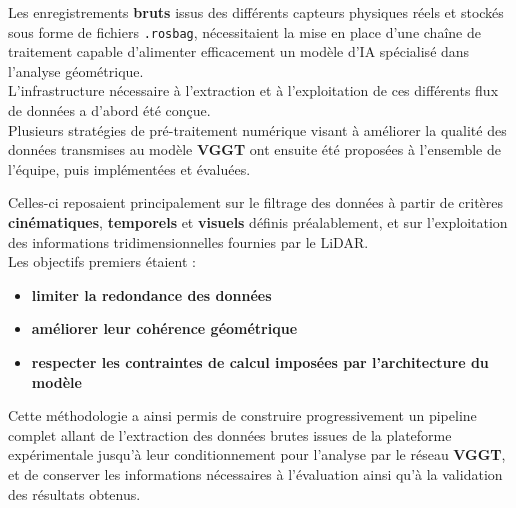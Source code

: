 \documentclass[12pt,a4paper,oneside]{report}
\newcommand{\textsb}[1]{{\fontseries{sb}\selectfont #1}}
\begin{document}
\hspace*{.5cm}Les enregistrements \textbf{bruts} issus des différents capteurs physiques réels et stockés sous forme de fichiers \texttt{.rosbag}, nécessitaient la mise en place d'une chaîne de traitement capable d'alimenter efficacement un modèle d'IA spécialisé dans l'analyse géométrique.\\

\hspace*{.3cm}L'infrastructure nécessaire à l'extraction et à l'exploitation de ces différents flux de données a d'abord été conçue.\\
\hspace*{0.3cm}Plusieurs stratégies de pré-traitement numérique visant à améliorer la qualité des données transmises au modèle \textbf{VGGT} ont ensuite été proposées à l'ensemble de l'équipe, puis implémentées et évaluées.\\

\bigskip

\hspace*{.3cm}Celles-ci reposaient principalement sur le filtrage des données à partir de critères \textbf{cinématiques}, \textbf{temporels} et \textbf{visuels} définis préalablement, et sur l'exploitation des informations tridimensionnelles fournies par le LiDAR.\\
Les objectifs premiers étaient :\vspace{0.2cm}

\begin{itemize}[label=\textbullet, leftmargin=2cm]
    \item \textbf{limiter la redondance des données}
    \item \textbf{améliorer leur cohérence géométrique}
    \item \textbf{respecter les contraintes de calcul imposées par l'architecture du modèle}
\end{itemize}

\vspace{0.9cm}

\textsb{\hspace*{.3cm}Cette méthodologie a ainsi permis de construire progressivement un pipeline complet allant de l'extraction des données brutes issues de la plateforme expérimentale jusqu'à leur conditionnement pour l'analyse par le réseau \textbf{VGGT}, et de conserver les informations nécessaires à l'évaluation ainsi qu'à la validation des résultats obtenus.}

\vspace*{\fill}
\end{document}

